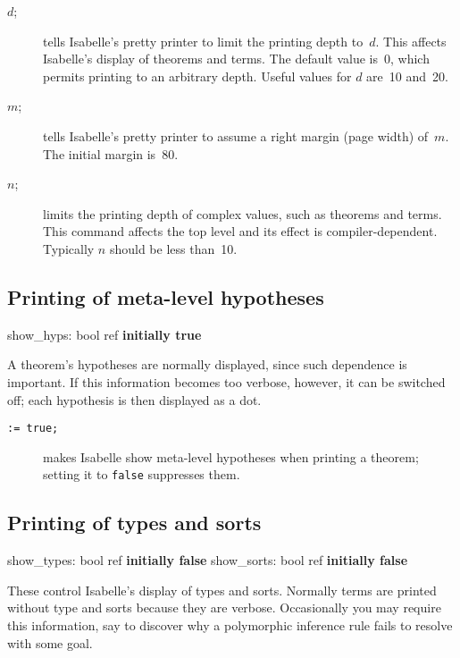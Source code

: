 \begin{description}
\item[ \(d\);]  tells
Isabelle's pretty printer to limit the printing depth to~$d$.  This affects
Isabelle's display of theorems and terms.  The default value is~0, which
permits printing to an arbitrary depth.  Useful values for $d$ are~10 and~20.

\item[ \(m\);]  tells
Isabelle's pretty printer to assume a right margin (page width) of~$m$.
The initial margin is~80.

\item[ \(n\);]  limits
the printing depth of complex \ML{} values, such as theorems and terms.
This command affects the \ML{} top level and its effect is
compiler-dependent.  Typically $n$ should be less than~10.
\end{description}


\subsection{Printing of meta-level hypotheses}
\begin{ttbox} 
show_hyps: bool ref \hfill{\bf initially true}
\end{ttbox}
A theorem's hypotheses are normally displayed, since such dependence is
important.  If this information becomes too verbose, however, it can be
switched off;  each hypothesis is then displayed as a dot.
\begin{description}
\item[ \tt:= true;]   
makes Isabelle show meta-level hypotheses when printing a theorem; setting
it to {\tt false} suppresses them.
\end{description}


\subsection{Printing of types and sorts}
\begin{ttbox} 
show_types: bool ref \hfill{\bf initially false}
show_sorts: bool ref \hfill{\bf initially false}
\end{ttbox}
These control Isabelle's display of types and sorts.  Normally terms are
printed without type and sorts because they are verbose.  Occasionally you
may require this information, say to discover why a polymorphic inference rule
fails to resolve with some goal.

